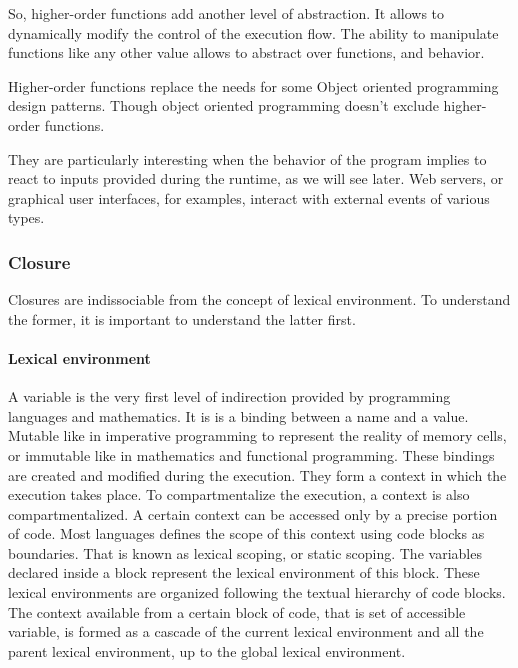 So, higher-order functions add another level of abstraction.
It allows to dynamically modify the control of the execution flow.
The ability to manipulate functions like any other value allows to abstract over functions, and behavior.

Higher-order functions replace the needs for some Object oriented programming design patterns. Though object oriented programming doesn't exclude higher-order functions.

They are particularly interesting when the behavior of the program implies to react to inputs provided during the runtime, as we will see later.
Web servers, or graphical user interfaces, for examples, interact with external events of various types.


\subsubsection{Closure}


Closures are indissociable from the concept of lexical environment.
To understand the former, it is important to understand the latter first.

\paragraph{Lexical environment}

A variable is the very first level of indirection provided by programming languages and mathematics.
It is is a binding between a name and a value.
Mutable like in imperative programming to represent the reality of memory cells, or immutable like in mathematics and functional programming.
These bindings are created and modified during the execution.
They form a context in which the execution takes place.
To compartmentalize the execution, a context is also compartmentalized.
A certain context can be accessed only by a precise portion of code.
Most languages defines the scope of this context using code blocks as boundaries.
That is known as lexical scoping, or static scoping.
The variables declared inside a block represent the lexical environment of this block.
These lexical environments are organized following the textual hierarchy of code blocks.
The context available from a certain block of code, that is set of accessible variable, is formed as a cascade of the current lexical environment and all the parent lexical environment, up to the global lexical environment.

